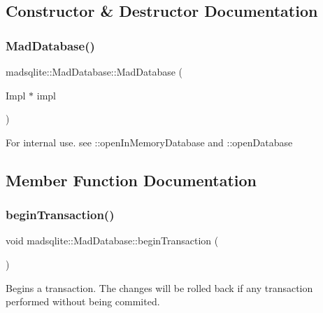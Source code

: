 \subsection{Constructor \& Destructor Documentation}
\hypertarget{classmadsqlite_1_1_mad_database_adeaa573aff2327d76018be2db2ecf638}{}\label{classmadsqlite_1_1_mad_database_adeaa573aff2327d76018be2db2ecf638} 
\subsubsection{\texorpdfstring{Mad\+Database()}{MadDatabase()}}
{\footnotesize\ttfamily madsqlite\+::\+Mad\+Database\+::\+Mad\+Database (\begin{DoxyParamCaption}\item[{Impl $\ast$}]{impl }\end{DoxyParamCaption})}

For internal use. see \+::open\+In\+Memory\+Database and \+::open\+Database 

\subsection{Member Function Documentation}
\hypertarget{classmadsqlite_1_1_mad_database_a985f7430489959d345b01ffc191a70d5}{}\label{classmadsqlite_1_1_mad_database_a985f7430489959d345b01ffc191a70d5} 
\subsubsection{\texorpdfstring{begin\+Transaction()}{beginTransaction()}}
{\footnotesize\ttfamily void madsqlite\+::\+Mad\+Database\+::begin\+Transaction (\begin{DoxyParamCaption}{ }\end{DoxyParamCaption})}

Begins a transaction. The changes will be rolled back if any transaction performed without being commited. \hypertarget{classmadsqlite_1_1_mad_database_a438b3c7393a84de57b638db06d84bd7b}{}\label{classmadsqlite_1_1_mad_database_a438b3c7393a84de57b638db06d84bd7b} 
